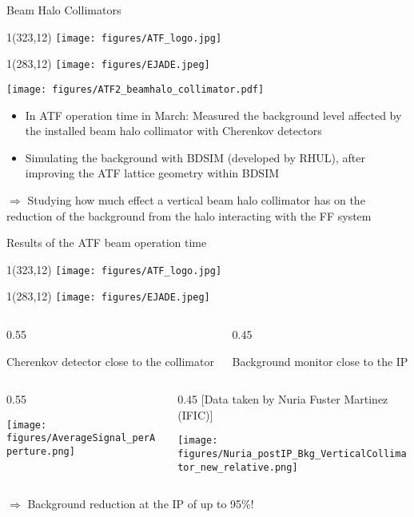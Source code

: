 \documentclass[xcolor={dvipsnames}]{beamer}
\newcommand{\atflogo}{
  \setlength{\TPHorizModule}{1pt}
  \setlength{\TPVertModule}{1pt}
  \begin{textblock}{1}(323,12)
   \texttt{[image: figures/ATF\_logo.jpg]}
  \end{textblock}
}
\newcommand{\ejadelogo}{
  \setlength{\TPHorizModule}{1pt}
  \setlength{\TPVertModule}{1pt}
  \begin{textblock}{1}(283,12)
   \texttt{[image: figures/EJADE.jpeg]}
  \end{textblock}
}
\begin{document}
\begin{frame}{Beam Halo Collimators}
\atflogo
\ejadelogo
 \begin{center}
\texttt{[image: figures/ATF2\_beamhalo\_collimator.pdf]}
\end{center}

\begin{itemize}
\item In ATF operation time in March: Measured the background level affected by the installed beam halo collimator with Cherenkov detectors
\item Simulating the background with BDSIM (developed by RHUL), after improving the ATF lattice geometry within BDSIM
\end{itemize}
\begin{block}{}
$\Rightarrow$ Studying how much effect a vertical beam halo collimator has on the reduction of the background from the halo interacting with the FF system
\end{block}
\end{frame}

\begin{frame}{Results of the ATF beam operation time}
\atflogo
\ejadelogo
\begin{columns}
 \begin{column}[c]{0.55\textwidth}
 \begin{center}
 \small Cherenkov detector close to the collimator
  \end{center}
 \end{column}
 \begin{column}[c]{0.45\textwidth}
  \begin{center}
 \small Background monitor close to the IP
  \end{center}
 \end{column}
\end{columns}

\begin{columns}
 \begin{column}[b]{0.55\textwidth}
 \begin{center}
   \texttt{[image: figures/AverageSignal\_perAperture.png]}
  \end{center}
 \end{column}
 \begin{column}[b]{0.45\textwidth}
 \flushright
 \tiny [Data taken by Nuria Fuster Martinez (IFIC)]
  \begin{center}
   \texttt{[image: figures/Nuria\_postIP\_Bkg\_VerticalCollimator\_new\_relative.png]}
  \end{center}
 \end{column}
\end{columns}
\begin{block}{}
$\Rightarrow$ Background reduction at the IP of up to 95\%!
\end{block}
\end{frame}
\end{document}
